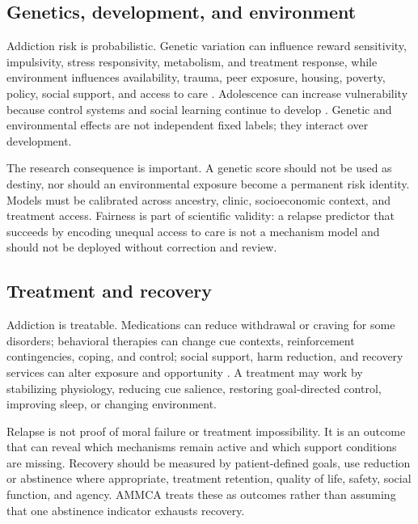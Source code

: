 \documentclass[conference]{IEEEtran}
\begin{document}
\subsection{Genetics, development, and environment}
Addiction risk is probabilistic. Genetic variation can influence reward sensitivity, impulsivity, stress responsivity, metabolism, and treatment response, while environment influences availability, trauma, peer exposure, housing, poverty, policy, social support, and access to care \cite{KreekNielsenButelmanLaForge2005,VolkowKoobMcLellan2016}. Adolescence can increase vulnerability because control systems and social learning continue to develop \cite{ChambersTaylorPotenza2003}. Genetic and environmental effects are not independent fixed labels; they interact over development.

The research consequence is important. A genetic score should not be used as destiny, nor should an environmental exposure become a permanent risk identity. Models must be calibrated across ancestry, clinic, socioeconomic context, and treatment access. Fairness is part of scientific validity: a relapse predictor that succeeds by encoding unequal access to care is not a mechanism model and should not be deployed without correction and review.

\subsection{Treatment and recovery}
Addiction is treatable. Medications can reduce withdrawal or craving for some disorders; behavioral therapies can change cue contexts, reinforcement contingencies, coping, and control; social support, harm reduction, and recovery services can alter exposure and opportunity \cite{NIDAAddiction,VolkowKoobMcLellan2016}. A treatment may work by stabilizing physiology, reducing cue salience, restoring goal-directed control, improving sleep, or changing environment.

Relapse is not proof of moral failure or treatment impossibility. It is an outcome that can reveal which mechanisms remain active and which support conditions are missing. Recovery should be measured by patient-defined goals, use reduction or abstinence where appropriate, treatment retention, quality of life, safety, social function, and agency. AMMCA treats these as outcomes rather than assuming that one abstinence indicator exhausts recovery.
\end{document}
